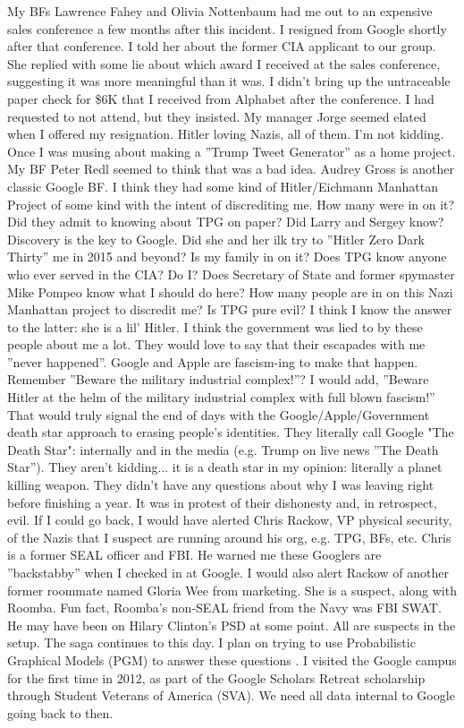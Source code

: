 \documentclass{article}
\begin{document}
\begin{multicols}{2}
My BFs Lawrence Fahey and Olivia Nottenbaum had me out to an expensive sales conference a few months after this incident. I resigned from Google shortly after that conference. I told her about the former CIA applicant to our group. She replied with some lie about which award I received at the sales conference, suggesting it was more meaningful than it was. I didn't bring up the untraceable paper check for \$6K that I received from Alphabet after the conference. I had requested to not attend, but they insisted. My manager Jorge seemed elated when I offered my resignation. Hitler loving Nazis, all of them. I'm not kidding. Once I was musing about making a ''Trump Tweet Generator'' as a home project. My BF Peter Redl seemed to think that was a bad idea. Audrey Gross is another classic Google BF. I think they had some kind of Hitler/Eichmann Manhattan Project of some kind with the intent of discrediting me. How many were in on it? Did they admit to knowing about TPG on paper? Did Larry and Sergey know? Discovery is the key to Google. Did she and her ilk try to ''Hitler Zero Dark Thirty'' me in 2015 and beyond? Is my family in on it? Does TPG know anyone who ever served in the CIA? Do I? Does Secretary of State and former spymaster Mike Pompeo know what I should do here? How many people are in on this Nazi Manhattan project to discredit me? Is TPG pure evil? I think I know the answer to the latter: she is a lil' Hitler. I think the government was lied to by these people about me a lot. They would love to say that their escapades with me ''never happened''. Google and Apple are fascism-ing to make that happen. Remember ''Beware the military industrial complex!''? I would add, ''Beware Hitler at the helm of the military industrial complex with full blown fascism!'' That would truly signal the end of days with the Google/Apple/Government death star approach to erasing people's identities. They literally call Google "The Death Star": internally and in the media (e.g. Trump on live news ''The Death Star''). They aren't kidding... it is a death star in my opinion: literally a planet killing weapon. They didn't have any questions about why I was leaving right before finishing a year. It was in protest of their dishonesty and, in retrospect, evil. If I could go back, I would have alerted Chris Rackow, VP physical security, of the Nazis that I suspect are running around his org, e.g. TPG, BFs, etc. Chris is a former SEAL officer and FBI. He warned me these Googlers are ''backstabby'' when I checked in at Google. I would also alert Rackow of another former roommate named Gloria Wee from marketing. She is a suspect, along with Roomba. Fun fact, Roomba's non-SEAL friend from the Navy was FBI SWAT. He may have been on Hilary Clinton's PSD at some point. All are suspects in the setup. The saga continues to this day. I plan on trying to use Probabilistic Graphical Models (PGM) to answer these questions \cite{probabilisticgraphicalmodels}. I visited the Google campus for the first time in 2012, as part of the Google Scholars Retreat scholarship through Student Veterans of America (SVA). We need all data internal to Google going back to then.


\end{multicols}
\end{document}
